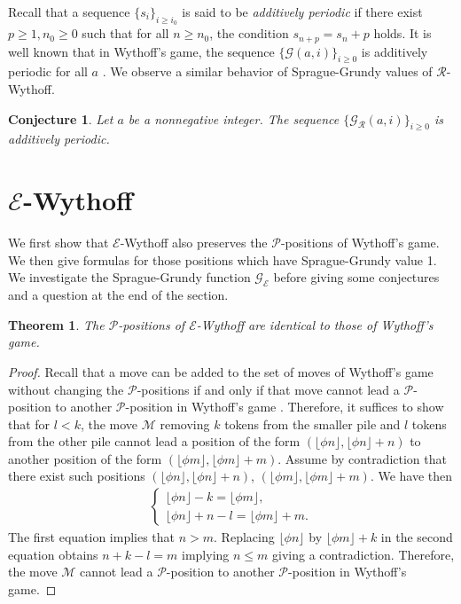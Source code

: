 \documentclass[12pt]{amsart}
\theoremstyle{plain}
\newtheorem{theorem}[proposition]{Theorem}
\newtheorem{conjecture}[proposition]{Conjecture}
\theoremstyle{definition}
\theoremstyle{remark}
\begin{document}
Recall that a sequence $\{s_i\}_{i \geq i_0}$ is said to be \emph{additively periodic} if there exist $p \geq 1, n_0 \geq 0$ such that for all $n \geq n_0$, the condition $s_{n+p} = s_n + p$ holds. It is well known that in Wythoff's game, the sequence $\{{\mathcal{G}}(a,i)\}_{i\geq 0}$ is additively periodic for all $a$ \cite{Dress, landman}. We observe a similar behavior of Sprague-Grundy values of ${\mathcal{R}}$-Wythoff.

\smallskip
\begin{conjecture} \label{BW-additive}
Let $a$ be a nonnegative integer. The sequence $\{{\mathcal{G}}_{\mathcal{R}}(a,i)\}_{i\geq 0}$ is additively periodic.
\end{conjecture}

\medskip

\section{${\mathcal{E}}$-Wythoff}
We first show that ${\mathcal{E}}$-Wythoff also preserves the ${\mathcal{P}}$-positions of Wythoff's game. We then give  formulas for those positions which have Sprague-Grundy value 1. We investigate the Sprague-Grundy function ${\mathcal{G}}_{\mathcal{E}}$ before giving some conjectures and a question at the end of the section.

\smallskip
\begin{theorem} \label{CW-P}
The ${\mathcal{P}}$-positions of ${\mathcal{E}}$-Wythoff are identical to those of Wythoff's game.
\end{theorem}

\begin{proof}
Recall that a move  can be added to the set of moves of Wythoff's game without changing the ${\mathcal{P}}$-positions if and only if that move cannot lead a ${\mathcal{P}}$-position to another ${\mathcal{P}}$-position in Wythoff's game \cite{blass}. Therefore, it suffices to show that for $l < k$, the move $\mathcal{M}$ removing $k$ tokens from the smaller pile and $l$ tokens from the other pile cannot lead a position of the form $(\lfloor \phi n \rfloor, \lfloor \phi n \rfloor +n)$ to another position of the form $(\lfloor \phi m \rfloor, \lfloor \phi m \rfloor +m)$. Assume by contradiction that there exist such positions $(\lfloor \phi n \rfloor, \lfloor \phi n \rfloor +n)$, $(\lfloor \phi m \rfloor, \lfloor \phi m \rfloor +m)$. We have then
\begin{align*}
\begin{cases}
\lfloor \phi n \rfloor - k = \lfloor \phi m \rfloor,\\
\lfloor \phi n \rfloor +n - l = \lfloor \phi m \rfloor +m.
\end{cases}
\end{align*}
The first equation implies that $n > m$. Replacing $\lfloor \phi n \rfloor$ by $\lfloor \phi m \rfloor +k$ in the second equation obtains $n+k-l=m$ implying $n \leq m$ giving a contradiction. Therefore, the move $\mathcal{M}$ cannot lead a ${\mathcal{P}}$-position to another ${\mathcal{P}}$-position in Wythoff's game.
\end{proof}
\end{document}
